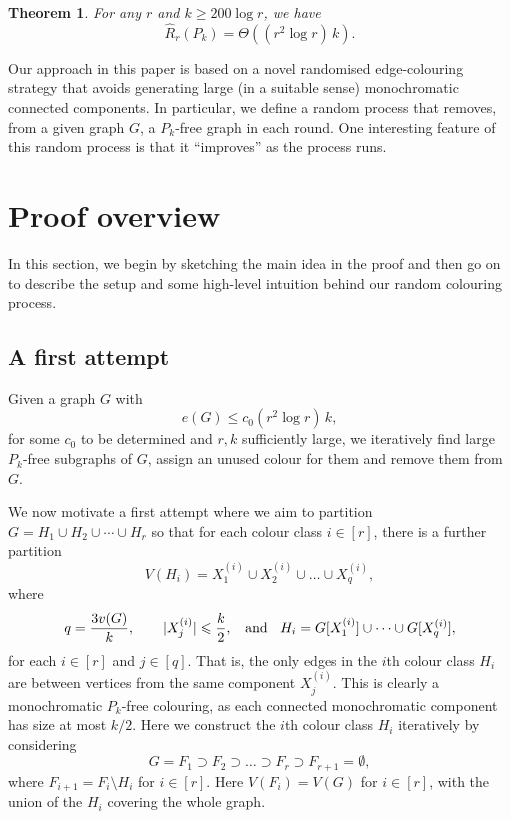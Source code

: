 \documentclass[12pt,reqno]{amsart}
\newtheorem{theorem}{Theorem}
\theoremstyle{remark}
\numberwithin{theorem}{section}
\renewcommand{\(}{\bigl(}
\renewcommand{\)}{\bigr)\vphantom{)}}
\renewcommand{\leq}{\le}
\renewcommand{\geq}{\ge}
\renewcommand{\le}{\leqslant}
\renewcommand{\ge}{\geqslant}
\begin{document}
\begin{theorem}\label{thm:main}
    For any $r$ and $k \geq 200\log r$, we have 
    $$\widehat{R}_r(P_k)=\Theta\left((r^2 \log r) \,k\right).$$  
\end{theorem} 

Our approach in this paper is based on a novel randomised edge-colouring strategy that avoids generating large (in a suitable sense) monochromatic connected components. In particular, we define a random process that removes, from a given graph $G$, a $P_k$-free graph in each round. One interesting feature of this random process is that it ``improves'' as the process runs. 

\section{Proof overview}\label{sec:sketch}
In this section, we begin by sketching the main idea in the proof and then go on to describe the setup and some high-level intuition behind our random colouring process. 

\subsection{A first attempt}\label{sec:sketch-main} 

Given a graph $G$ with 
\begin{equation}\label{eq:c0}
    e(G) \leq c_0 (r^2\log r)\, k,
\end{equation}
for some $c_0$ to be determined and $r,k$ sufficiently large, we iteratively find large $P_k$-free subgraphs of $G$, assign an unused colour for them and remove them from $G$. 

We now motivate a first attempt where we aim to partition $G = H_1 \cup H_2 \cup \cdots \cup H_r$ so that for each colour class $i \in [r]$, there is a further partition \[V(H_i) = X_1^{(i)}\cup X_2^{(i)}\cup \ldots \cup X_q^{(i)},\] where
\[q = \frac{3v(G)}{k}, \qquad |X_j^{(i)}|\leq \frac{k}{2}, \hspace{0.9em} \text{and} \hspace{0.9em}  H_i =G[X_1^{(i)}]\cup \dots \cup G[X_q^{(i)}],\]
for each $i\in [r]$ and $j \in [q]$. That is, the only edges in the $i$th colour class $H_i$ are between vertices from the same component $X_j^{(i)}$. This is clearly a monochromatic $P_k$-free colouring, as each connected monochromatic component has size at most $k/2$. Here we construct the $i$th colour class $H_i$ iteratively by considering \[G=F_1 \supset F_2 \supset \dots \supset F_r \supset F_{r+1}=\emptyset,\] where $F_{i+1} =  F_i \setminus H_i$ for $i \in [r]$. Here $V(F_i) = V(G)$ for $i \in [r]$, with the union of the $H_i$ covering the whole graph. 
\end{document}
